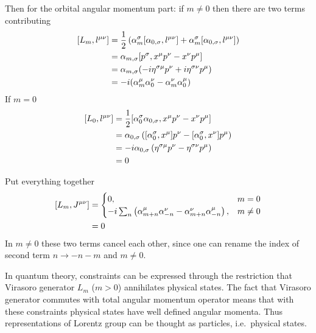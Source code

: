 Then for the orbital angular momentum part: if $m \neq 0$ then there are two terms contributing
\begin{align*}
	\comm{L_m}{l^{\mu\nu}} &= \frac{1}{2} \left( \alpha_m^\sigma \comm{\alpha_{0, \sigma} }{l^{\mu\nu}} + \alpha^\sigma_m \comm{\alpha_{0, \sigma}}{l^{\mu\nu}} \right) \\
								  &= \alpha_{m, \sigma} \comm{p^\sigma}{x^\mu p^\nu - x^\nu p^\mu} \\
								  &= \alpha_{m, \sigma} (-i\eta^{\sigma\mu} p^\nu +i \eta^{\sigma\nu}p^\mu) \\
								  &= -i (\alpha_m^\mu \alpha_0^\nu - \alpha_m^\nu \alpha^\mu_0)
\end{align*}
If $m=0$
\begin{align*}
	\comm{L_0}{l^{\mu\nu}} &= \frac{1}{2} \comm{\alpha_0^\sigma \alpha_{0, \sigma}}{x^\mu p^\nu - x^\nu p^\mu} \\
								  &= \alpha_{0, \sigma} \left( \comm{\alpha^\sigma_0}{x^\mu}p^\nu -  \comm{\alpha^\sigma_0}{x^\nu}p^\mu \right) \\
								  &= -i \alpha_{0, \sigma} \left( \eta^{\sigma \mu} p^\nu - \eta^{\sigma\nu} p^\mu \right)  \\ 
								  &= 0
\end{align*}

Put everything together
\begin{align*}
	\comm{L_m}{J^{\mu\nu}} &= 
	\begin{cases}
		0, & m=0 \\
		-i \sum_{n } \left( \alpha_{m+n}^\mu \alpha_{-n}^\nu  - \alpha^\nu_{m+n} \alpha^\mu_{-n} \right), & m \neq 0
	\end{cases} \\
								  &= 0
\end{align*}
In $m \neq 0$ these two terms cancel each other, since one can rename the index of second term $n \rightarrow -n - m$ and $m \neq 0$.

In quantum theory, constraints can be expressed through the restriction that Virasoro generator $L_m$ ($m > 0$) annihilates physical states. The fact that Virasoro generator commutes with total angular momentum operator means that with these constraints physical states have well defined angular momenta. Thus representations of Lorentz group can be thought as particles, i.e.~physical states.
